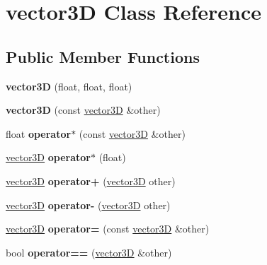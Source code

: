 \hypertarget{classvector3_d}{}\section{vector3D Class Reference}
\label{classvector3_d}
\subsection*{Public Member Functions}
\begin{DoxyCompactItemize}
\item 
\mbox{\label{classvector3_d_af00111e0595cdc3edc96168330ac24dc}} 
{\bfseries vector3D} (float, float, float)
\item 
\mbox{\label{classvector3_d_aed90c0ffec23e5e5cd3333132d6de8d0}} 
{\bfseries vector3D} (const \hyperlink{classvector3_d}{vector3D} \&other)
\item 
\mbox{\label{classvector3_d_a085951e3e9af18a73bf7e5b280f906dc}} 
float {\bfseries operator$\ast$} (const \hyperlink{classvector3_d}{vector3D} \&other)
\item 
\mbox{\label{classvector3_d_ab19aaad0d7b77fe890d4f2e64ff187fb}} 
\hyperlink{classvector3_d}{vector3D} {\bfseries operator$\ast$} (float)
\item 
\mbox{\label{classvector3_d_a549de8c94f3f6606d62b912fb94816f4}} 
\hyperlink{classvector3_d}{vector3D} {\bfseries operator+} (\hyperlink{classvector3_d}{vector3D} other)
\item 
\mbox{\label{classvector3_d_a10f2fd21bf73cc2ace59bd1fa0cf116d}} 
\hyperlink{classvector3_d}{vector3D} {\bfseries operator-\/} (\hyperlink{classvector3_d}{vector3D} other)
\item 
\mbox{\label{classvector3_d_abda3e2223f18a593705c3a2e964c0d79}} 
\hyperlink{classvector3_d}{vector3D} {\bfseries operator=} (const \hyperlink{classvector3_d}{vector3D} \&other)
\item 
\mbox{\label{classvector3_d_a2113497f551547b65cd1342ddfd2967b}} 
bool {\bfseries operator==} (\hyperlink{classvector3_d}{vector3D} \&other)

\end{DoxyCompactItemize}
